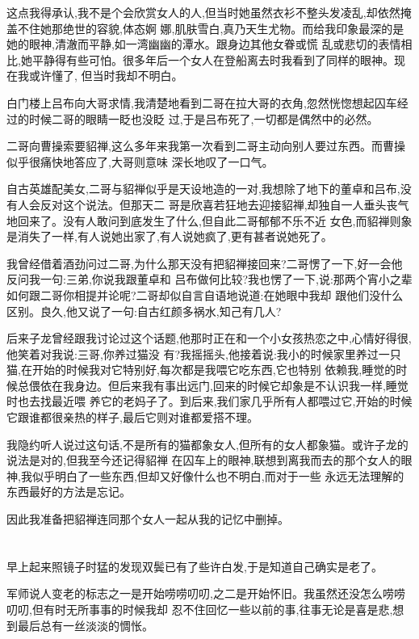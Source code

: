﻿\documentclass[12pt,twocolumn]{article}
\begin{document}
这点我得承认,我不是个会欣赏女人的人,但当时她虽然衣衫不整头发凌乱,却依然掩盖不住她那绝世的容貌,体态婀
娜,肌肤雪白,真乃天生尤物。而给我印象最深的是她的眼神,清澈而平静,如一湾幽幽的潭水。跟身边其他女眷或慌
乱或悲切的表情相比,她平静得有些可怕。很多年后一个女人在登船离去时我看到了同样的眼神。现在我或许懂了,
但当时我却不明白。

白门楼上吕布向大哥求情,我清楚地看到二哥在拉大哥的衣角,忽然恍惚想起囚车经过的时候二哥的眼睛一眨也没眨
过,于是吕布死了,一切都是偶然中的必然。

二哥向曹操索要貂禅,这么多年来我第一次看到二哥主动向别人要过东西。而曹操似乎很痛快地答应了,大哥则意味
深长地叹了一口气。

自古英雄配美女,二哥与貂禅似乎是天设地造的一对,我想除了地下的董卓和吕布,没有人会反对这个说法。但那天二
哥是欣喜若狂地去迎接貂禅,却独自一人垂头丧气地回来了。没有人敢问到底发生了什么,但自此二哥郁郁不乐不近
女色,而貂禅则象是消失了一样,有人说她出家了,有人说她疯了,更有甚者说她死了。

我曾经借着酒劲问过二哥,为什么那天没有把貂禅接回来?二哥愣了一下,好一会他反问我一句:三弟,你说我跟董卓和
吕布做何比较?我也愣了一下,说:那两个宵小之辈如何跟二哥你相提并论呢?二哥却似自言自语地说道:在她眼中我却
跟他们没什么区别。良久,他又说了一句:自古红颜多祸水,知己有几人?

后来子龙曾经跟我讨论过这个话题,他那时正在和一个小女孩热恋之中,心情好得很,他笑着对我说:三哥,你养过猫没
有?我摇摇头,他接着说:我小的时候家里养过一只猫,在开始的时候我对它特别好,每次都是我喂它吃东西,它也特别
依赖我,睡觉的时候总偎依在我身边。但后来我有事出远门,回来的时候它却象是不认识我一样,睡觉时也去找最近喂
养它的老妈子了。到后来,我们家几乎所有人都喂过它,开始的时候它跟谁都很亲热的样子,最后它则对谁都爱搭不理。

我隐约听人说过这句话,不是所有的猫都象女人,但所有的女人都象猫。或许子龙的说法是对的,但我至今还记得貂禅
在囚车上的眼神,联想到离我而去的那个女人的眼神,我似乎明白了一些东西,但却又好像什么也不明白,而对于一些
永远无法理解的东西最好的方法是忘记。

因此我准备把貂禅连同那个女人一起从我的记忆中删掉。

\section{}

早上起来照镜子时猛的发现双鬓已有了些许白发,于是知道自己确实是老了。

军师说人变老的标志之一是开始唠唠叨叨,之二是开始怀旧。我虽然还没怎么唠唠叨叨,但有时无所事事的时候我却
忍不住回忆一些以前的事,往事无论是喜是悲,想到最后总有一丝淡淡的惆怅。
\end{document}
